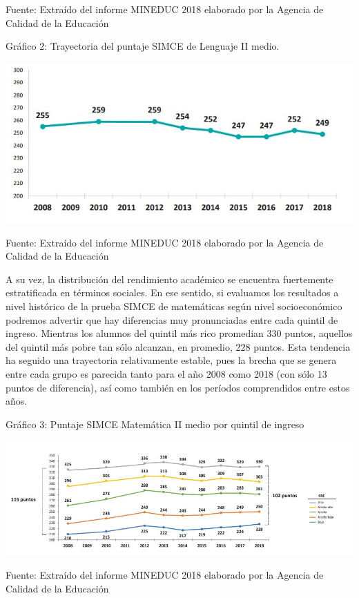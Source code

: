 \documentclass[
]{article}
\begin{document}
Fuente: Extraído del informe MINEDUC 2018 elaborado por la Agencia de
Calidad de la Educación

Gráfico 2: Trayectoria del puntaje SIMCE de Lenguaje II medio.

\includegraphics{input/images/trayectoria_sim_leng.jpg}

Fuente: Extraído del informe MINEDUC 2018 elaborado por la Agencia de
Calidad de la Educación

A su vez, la distribución del rendimiento académico se encuentra
fuertemente estratificada en términos sociales. En ese sentido, si
evaluamos los resultados a nivel histórico de la prueba SIMCE de
matemáticas según nivel socioeconómico podremos advertir que hay
diferencias muy pronunciadas entre cada quintil de ingreso. Mientras los
alumnos del quintil más rico promedian 330 puntos, aquellos del quintil
más pobre tan sólo alcanzan, en promedio, 228 puntos. Esta tendencia ha
seguido una trayectoria relativamente estable, pues la brecha que se
genera entre cada grupo es parecida tanto para el año 2008 como 2018
(con sólo 13 puntos de diferencia), así como también en los períodos
comprendidos entre estos años.

Gráfico 3: Puntaje SIMCE Matemática II medio por quintil de ingreso

\includegraphics{input/images/puntaje_mate_nse.jpg}

Fuente: Extraído del informe MINEDUC 2018 elaborado por la Agencia de
Calidad de la Educación
\end{document}
